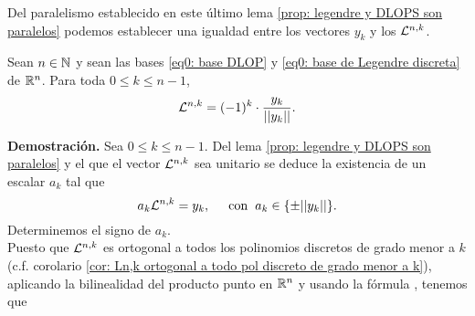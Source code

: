 \noindent Del paralelismo
establecido en este último lema
\ref{prop: legendre y DLOPS son paralelos}
podemos establecer una igualdad 
entre los vectores $y_{k}$ y los $\mathcal{L}^{n,k}$.

\begin{prop}
\label{prop: igualdad entre los de legendre y los del survey}
Sean $n \in \mathbb{N}$ y sean las bases 
\eqref{eq0: base DLOP} y 
\eqref{eq0: base de Legendre discreta} de $\mathbb{R}^{n}$.
Para toda $0 \leq k \leq n-1$, 
\begin{equation}
\label{eq9: 2Dic}
\mathcal{L}^{n,k}= (-1)^{k} \cdot \frac{y_{k}}{||y_{k}||}.
\end{equation}
\end{prop}
\noindent
\textbf{Demostración.}
Sea $0 \leq k \leq n-1$. Del lema
\ref{prop: legendre y DLOPS son paralelos}
y el que el vector
$\mathcal{L}^{n,k}$ sea unitario
se deduce la existencia de un escalar $a_{k}$
tal que 
\begin{equation}
\label{eq10: 2Dic}
a_{k}\mathcal{L}^{n,k}= y_{k}, \hspace{0.5cm}
\text{con} \hspace{0.2cm} a_{k} \in \{ \pm || y_{k} || \}.
\end{equation}
Determinemos el signo de $a_{k}$. \\

\noindent Puesto que $\mathcal{L}^{n,k}$ es ortogonal a todos los polinomios
discretos de grado menor a $k$
(c.f. corolario
\ref{cor: Ln,k ortogonal a todo pol discreto de grado menor a k}), aplicando la bilinealidad
del producto punto en $\mathbb{R}^{n}$ y usando la fórmula 
\TODO{[Survey(7)]},
tenemos que

